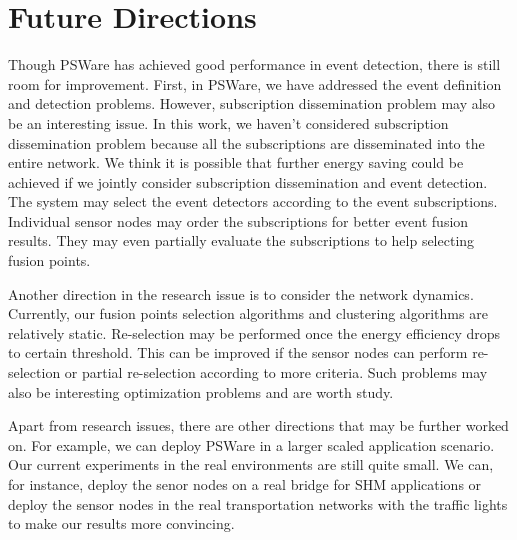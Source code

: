 \section{Future Directions}
Though PSWare has achieved good performance in event detection, there is still room for improvement. First, in PSWare, we have addressed the event definition and detection problems. However, subscription dissemination problem may also be an interesting issue. In this work, we haven't considered subscription dissemination problem because all the subscriptions are disseminated into the entire network. We think it is possible that further energy saving could be achieved if we jointly consider subscription dissemination and event detection. The system may select the event detectors according to the event subscriptions. Individual sensor nodes may order the subscriptions for better event fusion results. They may even partially evaluate the subscriptions to help selecting fusion points.

Another direction in the research issue is to consider the network dynamics. Currently, our fusion points selection algorithms and clustering algorithms are relatively static. Re-selection may be performed once the energy efficiency drops to certain threshold. This can be improved if the sensor nodes can perform re-selection or partial re-selection according to more criteria. Such problems may also be interesting optimization problems and are worth study.

Apart from research issues, there are other directions that may be further worked on. For example, we can deploy PSWare in a larger scaled application scenario. Our current experiments in the real environments are still quite small. We can, for instance, deploy the senor nodes on a real bridge for SHM applications or deploy the sensor nodes in the real transportation networks with the traffic lights to make our results more convincing.
